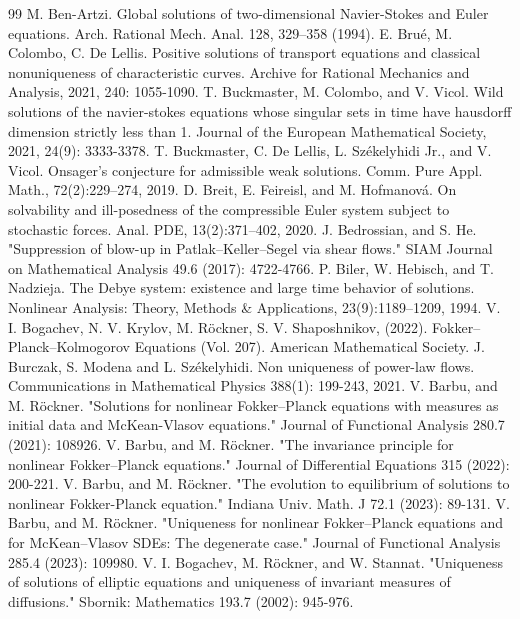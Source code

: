 \documentclass[10pt,a4paper]{amsart}
\numberwithin{equation}{section}
\begin{document}
\begin{thebibliography}{99}
 M. Ben-Artzi. Global solutions of two-dimensional Navier-Stokes and Euler equations. Arch. Rational Mech. Anal. 128, 329–358 (1994).
 E. Bru\'e, M. Colombo, C. De Lellis. Positive solutions of transport equations and classical nonuniqueness of characteristic curves. Archive for Rational Mechanics and Analysis, 2021, 240: 1055-1090.
 T. Buckmaster, M. Colombo, and V. Vicol. Wild solutions of the navier-stokes equations whose singular sets in time have hausdorff dimension strictly less than 1. Journal of the European Mathematical Society, 2021, 24(9): 3333-3378.
 T. Buckmaster, C. De Lellis, L. Sz\'{e}kelyhidi Jr., and V. Vicol. Onsager’s conjecture for admissible weak solutions. Comm. Pure Appl. Math., 72(2):229–274, 2019.
 D. Breit, E. Feireisl, and M. Hofmanov\'a. On solvability and ill-posedness of the compressible Euler system subject to stochastic forces. Anal. PDE, 13(2):371–402, 2020.
 J. Bedrossian, and S. He. "Suppression of blow-up in Patlak--Keller--Segel via shear flows." SIAM Journal on Mathematical Analysis 49.6 (2017): 4722-4766.
 P. Biler, W. Hebisch, and T. Nadzieja. The Debye system: existence and large time behavior of solutions. Nonlinear Analysis: Theory, Methods \& Applications, 23(9):1189–1209, 1994.
 V. I. Bogachev, N. V. Krylov, M. R\"ockner, S. V. Shaposhnikov, (2022). Fokker–Planck–Kolmogorov Equations (Vol. 207). American Mathematical Society.
 J. Burczak, S. Modena and L. Sz\'ekelyhidi. Non uniqueness of power-law flows. Communications in Mathematical Physics 388(1): 199-243, 2021.
 V. Barbu, and M. R\"ockner. "Solutions for nonlinear Fokker–Planck equations with measures as initial data and McKean-Vlasov equations." Journal of Functional Analysis 280.7 (2021): 108926.
 V. Barbu, and M. R\"ockner. "The invariance principle for nonlinear Fokker–Planck equations." Journal of Differential Equations 315 (2022): 200-221.
 V. Barbu, and M. R\"ockner. "The evolution to equilibrium of solutions to nonlinear Fokker-Planck equation." Indiana Univ. Math. J 72.1 (2023): 89-131.
 V. Barbu, and M. R\"ockner. "Uniqueness for nonlinear Fokker–Planck equations and for McKean–Vlasov SDEs: The degenerate case." Journal of Functional Analysis 285.4 (2023): 109980.
 V. I. Bogachev, M. R\"ockner, and W. Stannat. "Uniqueness of solutions of elliptic equations and uniqueness of invariant measures of diffusions." Sbornik: Mathematics 193.7 (2002): 945-976.

\end{thebibliography}
\end{document}
